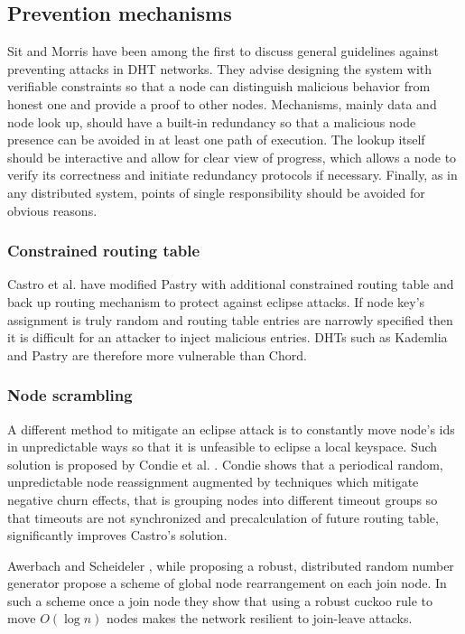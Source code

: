   \subsection{Prevention mechanisms}

  Sit and Morris \cite{sit02} have been among the first to discuss general
  guidelines against preventing attacks in DHT networks. They advise designing
  the system with verifiable constraints so that a node can distinguish
  malicious behavior from honest one and provide a proof to other nodes.
  Mechanisms, mainly data and node look up, should have a built-in redundancy so
  that a malicious node presence can be avoided in at least one path of
  execution. The lookup itself should be interactive and allow for clear view of
  progress, which allows a node to verify its correctness and initiate
  redundancy protocols if necessary. Finally, as in any distributed system,
  points of single responsibility should be avoided for obvious reasons.
  
  \subsubsection{Constrained routing table}
  Castro et al. \cite[p. 20]{urd11} have modified Pastry with additional
  constrained routing table and back up routing mechanism to protect against
  eclipse attacks. If node key's assignment is truly random and routing table
  entries are narrowly specified then it is difficult for an attacker to inject
  malicious entries. DHTs such as Kademlia and Pastry are therefore more
  vulnerable than Chord.

  \subsubsection{Node scrambling}
  A different method to mitigate an eclipse attack is to constantly move node's
  ids in unpredictable ways so that it is unfeasible to eclipse a local
  keyspace. Such solution is proposed by Condie et al. \cite[p. 21]{urd11}.
  Condie shows that a periodical random, unpredictable node reassignment
  augmented by techniques which mitigate negative churn effects, that is
  grouping nodes into different timeout groups so that timeouts are not
  synchronized and precalculation of future routing table, significantly
  improves Castro's solution.

  Awerbach and Scheideler \cite{awe10}, while proposing a robust, distributed
  random number generator propose a scheme of global node rearrangement on each
  join node. In such a scheme once a join node they show that using a robust
  cuckoo rule to move $O(\log n)$ nodes makes the network resilient to
  join-leave attacks.

